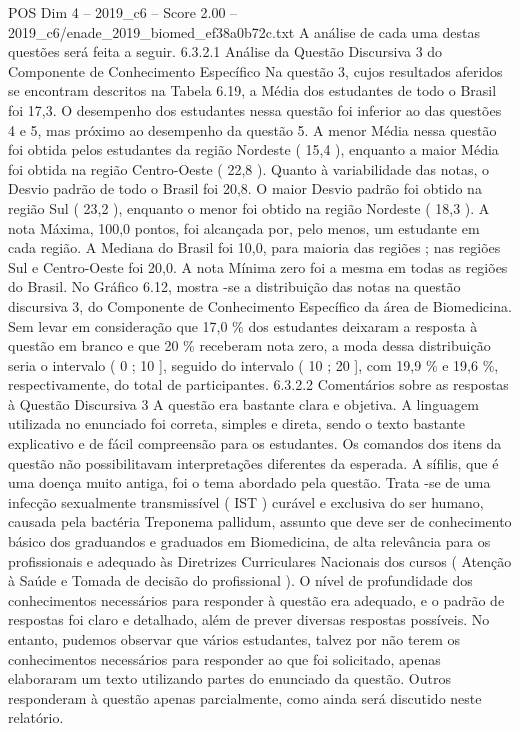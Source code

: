 \begin{textsample}{POS Dim 4 – 2019\_c6 – Score 2.00 – 2019\_c6/enade\_2019\_biomed\_ef38a0b72c.txt}
A análise de cada uma destas questões será feita a seguir. 6.3.2.1 Análise da Questão Discursiva 3 do Componente de Conhecimento Específico Na questão 3, cujos resultados aferidos se encontram descritos na Tabela 6.19, a Média dos estudantes de todo o Brasil foi 17,3.
O desempenho dos estudantes nessa questão foi inferior ao das questões 4 e 5, mas próximo ao desempenho da questão 5.
A menor Média nessa questão foi obtida pelos estudantes da região Nordeste ( 15,4 ), enquanto a maior Média foi obtida na região Centro-Oeste ( 22,8 ).
Quanto à variabilidade das notas, o Desvio padrão de todo o Brasil foi 20,8.
O maior Desvio padrão foi obtido na região Sul ( 23,2 ), enquanto o menor foi obtido na região Nordeste ( 18,3 ).
A nota Máxima, 100,0 pontos, foi alcançada por, pelo menos, um estudante em cada região.
A Mediana do Brasil foi 10,0, para maioria das regiões ; nas regiões Sul e Centro-Oeste foi 20,0.
A nota Mínima zero foi a mesma em todas as regiões do Brasil.
No Gráfico 6.12, mostra -se a distribuição das notas na questão discursiva 3, do Componente de Conhecimento Específico da área de Biomedicina.
Sem levar em consideração que 17,0 \% dos estudantes deixaram a resposta à questão em branco e que 20 \% receberam nota zero, a moda dessa distribuição seria o intervalo ( 0 ; 10 ], seguido do intervalo ( 10 ; 20 ], com 19,9 \% e 19,6 \%, respectivamente, do total de participantes. 6.3.2.2 Comentários sobre as respostas à Questão Discursiva 3 A questão era bastante clara e objetiva.
A linguagem utilizada no enunciado foi correta, simples e direta, sendo o texto bastante explicativo e de fácil compreensão para os estudantes.
Os comandos dos itens da questão não possibilitavam interpretações diferentes da esperada.
A sífilis, que é uma doença muito antiga, foi o tema abordado pela questão.
Trata -se de uma infecção sexualmente transmissível ( IST ) curável e exclusiva do ser humano, causada pela bactéria Treponema pallidum, assunto que deve ser de conhecimento básico dos graduandos e graduados em Biomedicina, de alta relevância para os profissionais e adequado às Diretrizes Curriculares Nacionais dos cursos ( Atenção à Saúde e Tomada de decisão do profissional ).
O nível de profundidade dos conhecimentos necessários para responder à questão era adequado, e o padrão de respostas foi claro e detalhado, além de prever diversas respostas possíveis.
No entanto, pudemos observar que vários estudantes, talvez por não terem os conhecimentos necessários para responder ao que foi solicitado, apenas elaboraram um texto utilizando partes do enunciado da questão.
Outros responderam à questão apenas parcialmente, como ainda será discutido neste relatório.

\end{textsample}
